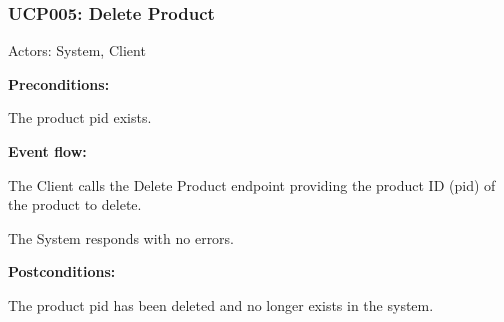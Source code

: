 \begin{ucbox}{\subsubsection{UCP005: Delete Product}}
\label{UCP005}

Actors: System, Client

\textbf{Preconditions:}

\ucitem The product pid exists.

\textbf{Event flow:}

\ucitem The Client calls the Delete Product endpoint providing the product ID (pid) of the product to delete.

\ucitem The System responds with no errors.

\textbf{Postconditions:}

\ucitem The product pid has been deleted and no longer exists in the system.

\end{ucbox}
\newpage